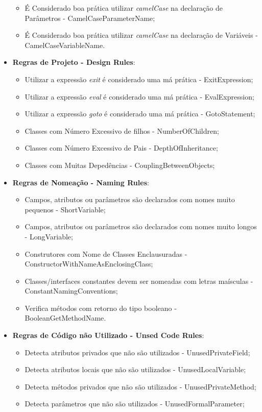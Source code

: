 \begin{itemize}
\begin{itemize}
			\item É Considerado boa prática utilizar \textit{camelCase} na declaração
            de Parâmetros - CamelCaseParameterName;
			\item É Considerado boa prática utilizar \textit{camelCase} na declaração
            de Variáveis - CamelCaseVariableName.
		\end{itemize}
  \item \textbf{Regras de Projeto - Design Rules}:
		\begin{itemize}
			\item Utilizar a expressão \textit{exit} é considerado uma má prática - ExitExpression;
			\item Utilizar a expressão \textit{eval} é considerado uma má prática - EvalExpression;
			\item Utilizar a expressão \textit{goto} é considerado uma má prática - GotoStatement;
			\item Classes com Número Excessivo de filhos - NumberOfChildren;
			\item Classes com Número Excessivo de Pais - DepthOfInheritance;
			\item Classes com Muitas Depedências - CouplingBetweenObjects;
		\end{itemize}
  \item \textbf{Regras de Nomeação - Naming Rules}:
		\begin{itemize}
			\item Campos, atributos ou parâmetros são declarados com nomes muito
            pequenos - ShortVariable;
			\item Campos, atributos ou parâmetros são declarados com nomes muito
            longos - LongVariable;
      \item Construtores com Nome de Classes Enclausuradas -
            ConstructorWithNameAsEnclosingClass;
      \item Classes/interfaces constantes devem ser nomeadas com letras
            maísculas - ConstantNamingConventions;
      \item Verifica métodos com retorno do tipo booleano - BooleanGetMethodName.
		\end{itemize}
  \item \textbf{Regras de Código não Utilizado - Unsed Code Rules}:
    \begin{itemize}
      \item Detecta atributos privados que não são utilizados - UnusedPrivateField;
      \item Detecta atributos locais que não são utilizados - UnusedLocalVariable;
      \item Detecta métodos privados que não são utilizados - UnusedPrivateMethod;
      \item Detecta parâmetros que não são utilizados - UnusedFormalParameter;
    \end{itemize}
\end{itemize}


